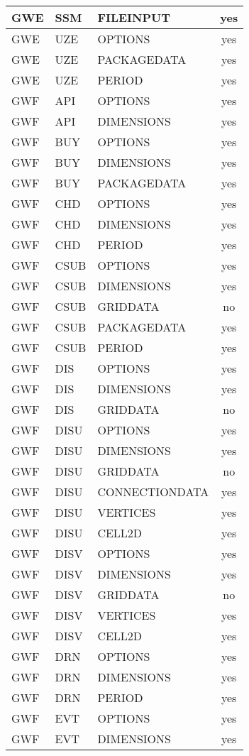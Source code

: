 \begin{longtable}{p{1.5cm} p{1.5cm} p{3cm} c}
GWE & SSM & FILEINPUT & yes \\ 
\hline
GWE & UZE & OPTIONS & yes \\ 
GWE & UZE & PACKAGEDATA & yes \\ 
GWE & UZE & PERIOD & yes \\ 
\hline
GWF & API & OPTIONS & yes \\ 
GWF & API & DIMENSIONS & yes \\ 
\hline
GWF & BUY & OPTIONS & yes \\ 
GWF & BUY & DIMENSIONS & yes \\ 
GWF & BUY & PACKAGEDATA & yes \\ 
\hline
GWF & CHD & OPTIONS & yes \\ 
GWF & CHD & DIMENSIONS & yes \\ 
GWF & CHD & PERIOD & yes \\ 
\hline
GWF & CSUB & OPTIONS & yes \\ 
GWF & CSUB & DIMENSIONS & yes \\ 
GWF & CSUB & GRIDDATA & no \\ 
GWF & CSUB & PACKAGEDATA & yes \\ 
GWF & CSUB & PERIOD & yes \\ 
\hline
GWF & DIS & OPTIONS & yes \\ 
GWF & DIS & DIMENSIONS & yes \\ 
GWF & DIS & GRIDDATA & no \\ 
\hline
GWF & DISU & OPTIONS & yes \\ 
GWF & DISU & DIMENSIONS & yes \\ 
GWF & DISU & GRIDDATA & no \\ 
GWF & DISU & CONNECTIONDATA & yes \\ 
GWF & DISU & VERTICES & yes \\ 
GWF & DISU & CELL2D & yes \\ 
\hline
GWF & DISV & OPTIONS & yes \\ 
GWF & DISV & DIMENSIONS & yes \\ 
GWF & DISV & GRIDDATA & no \\ 
GWF & DISV & VERTICES & yes \\ 
GWF & DISV & CELL2D & yes \\ 
\hline
GWF & DRN & OPTIONS & yes \\ 
GWF & DRN & DIMENSIONS & yes \\ 
GWF & DRN & PERIOD & yes \\ 
\hline
GWF & EVT & OPTIONS & yes \\ 
GWF & EVT & DIMENSIONS & yes \\ 

\end{longtable}
